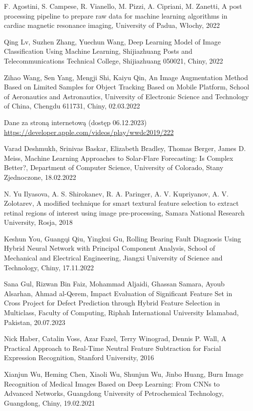 \documentclass[12pt, a4paper, twoside, openany]{book}
\begin{document}
{\begin{enumerate}[label={[}\arabic*{]}]
    \item F. Agostini, S. Campese, R. Vianello, M. Pizzi, A. Cipriani, M. Zanetti, A post processing pipeline to prepare raw data for machine learning algorithms in cardiac magnetic resonance imaging, University of Padua, Włochy, 2022
    \item Qing Lv, Suzhen Zhang, Yuechun Wang, Deep Learning Model of Image Classification Using Machine Learning, Shijiazhuang Posts and Telecommunications Technical College, Shijiazhuang 050021, Chiny, 2022
    \item Zihao Wang, Sen Yang, Mengji Shi, Kaiyu Qin, An Image Augmentation Method Based on Limited Samples for Object Tracking Based on Mobile Platform, School of Aeronautics and Astronautics, University of Electronic Science and Technology of China, Chengdu 611731, Chiny, 02.03.2022
    \item Dane za stroną internetową (dostęp 06.12.2023) \url{https://developer.apple.com/videos/play/wwdc2019/222}
    \item Varad Deshmukh, Srinivas Baskar, Elizabeth Bradley, Thomas Berger, James D. Meiss, Machine Learning Approaches to Solar-Flare Forecasting: Is Complex Better?, Department of Computer Science, University of Colorado, Stany Zjednoczone, 18.02.2022
    \item N. Yu Ilyasova, A. S. Shirokanev, R. A. Paringer, A. V. Kupriyanov, A. V. Zolotarev, A modified technique for smart textural feature selection to extract retinal regions of interest using image pre-processing, Samara National Research University, Rosja, 2018
    \item Keshun You, Guangqi Qiu, Yingkui Gu, Rolling Bearing Fault Diagnosis Using Hybrid Neural Network with Principal Component Analysis, School of Mechanical and Electrical Engineering, Jiangxi University of Science and Technology, Chiny, 17.11.2022
    \item Sana Gul, Rizwan Bin Faiz, Mohammad Aljaidi, Ghassan Samara, Ayoub Alsarhan, Ahmad al-Qerem, Impact Evaluation of Significant Feature Set in Cross Project for Defect Prediction through Hybrid Feature Selection in Multiclass, Faculty of Computing, Riphah International University Islamabad, Pakistan, 20.07.2023
    \item Nick Haber, Catalin Voss, Azar Fazel, Terry Winograd, Dennis P. Wall, A Practical Approach to Real-Time Neutral Feature Subtraction for Facial Expression Recognition, Stanford University, 2016
    \item Xianjun Wu, Heming Chen, Xiaoli Wu, Shunjun Wu, Jinbo Huang, Burn Image Recognition of Medical Images Based on Deep Learning: From CNNs to Advanced Networks, Guangdong University of Petrochemical Technology, Guangdong, Chiny, 19.02.2021

\end{enumerate}}
\end{document}
